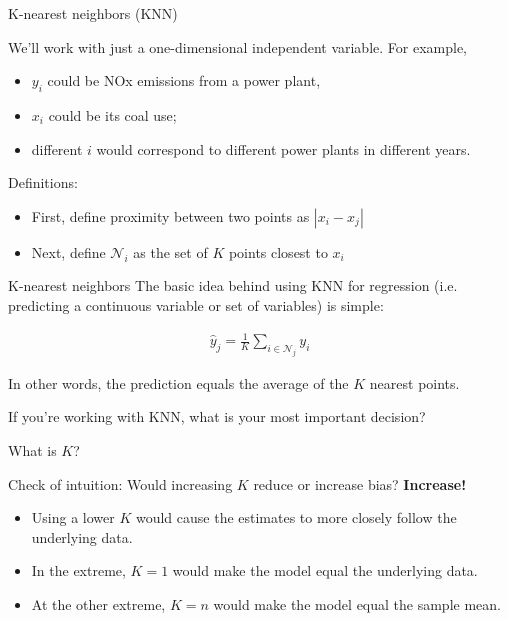 \documentclass[aspectratio=169, handout]{beamer}
\begin{document}
\begin{frame}{K-nearest neighbors (KNN)}

 We'll work with just a one-dimensional independent variable. For example, 
\begin{itemize}
\item $y_i$ could be NOx emissions from a power plant, 
\item $x_i$ could be its coal use; 
\item different $i$ would correspond to different power plants in different years.
\end{itemize}

\vspace{5mm}
Definitions:
\begin{itemize}
\item First, define proximity between two points as $|x_i-x_j|$
\item Next, define $\mathcal{N}_i$ as the set of $K$ points closest to $x_i$ 
\end{itemize}

\end{frame}

\begin{frame}{K-nearest neighbors}
The basic idea behind using KNN for regression (i.e. predicting a continuous variable or set of variables) is simple:

\begin{align*}
\hat{y}_j = \frac{1}{K} \sum_{i\in \mathcal{N}_j} y_i
\end{align*}

In other words, the prediction equals the average of the $K$ nearest points.
\end{frame}

\begin{frame}{If you're working with KNN, what is your most important decision?}

\pause

\begin{center}
What is $K$?
\end{center}

Check of intuition:  Would increasing $K$ reduce or increase bias?\pause \textbf{  Increase!}

\begin{itemize}
\item Using a lower $K$ would cause the estimates to more closely follow the underlying data.  
\item In the extreme, $K=1$ would make the model equal the underlying data.
\item At the other extreme, $K=n$ would make the model equal the sample mean.
\end{itemize}
\end{frame}
\end{document}
